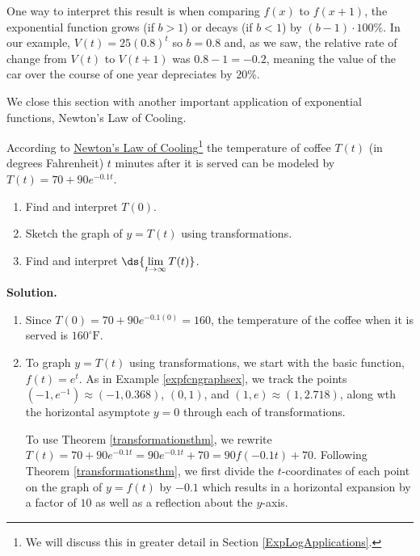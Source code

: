 \documentclass{ximera}
\begin{document}
One way to interpret this result is when comparing $f(x)$ to $f(x+1)$, the exponential function grows (if $b>1$) or decays (if $b<1$) by $(b-1) \cdot 100 \%$.  In our example, $V(t) = 25 (0.8)^{t}$ so $b = 0.8$ and, as we saw, the relative rate of change from $V(t)$ to $V(t+1)$ was $ 0.8 - 1= -0.2$, meaning the value of the car  over the course of one year depreciates by  $20 \%$.

\smallskip

We close this section with another important application of exponential functions,  Newton's Law of Cooling.

\smallskip

\begin{example}  \label{exptempex} According to \href{http://en.wikipedia.org/wiki/Heat_transfer#Newton.27s_law_of_cooling}{\underline{Newton's Law of Cooling}}\footnote{We will discuss this in greater detail in Section \ref{ExpLogApplications}.} the temperature of coffee $T(t)$ (in degrees Fahrenheit) $t$ minutes after it is served can be modeled by $T(t) = 70 + 90 e^{-0.1 t}$. 

\begin{enumerate}

\item  Find and interpret $T(0)$.

\item  Sketch the graph of $y = T(t)$ using transformations.

\item  Find and interpret $\ds{\lim_{t \rightarrow \infty} T(t)}$.  

\end{enumerate}

{\bf Solution.}

\begin{enumerate}

\item  Since $T(0) =70 + 90 e^{-0.1 (0)} = 160$,   the temperature of the coffee when it is served is $160^{\circ}\mbox{F}$.

\item  To graph $y = T(t)$ using transformations, we start with the basic function, $f(t)=e^{t}$.  As in Example \ref{expfcngraphsex}, we track the points $(-1, e^{-1}) \approx (-1, 0.368)$, $(0,1)$, and $(1, e) \approx (1, 2.718)$, along wth the horizontal asymptote $y = 0$ through each of transformations.

\smallskip

To use Theorem  \ref{transformationsthm}, we rewrite   $T(t) = 70 + 90e^{-0.1t} = 90e^{-0.1t}+70 = 90 f(-0.1t)+70$.   Following Theorem  \ref{transformationsthm}, we first  divide the $t$-coordinates of each point on the graph of $y=f(t)$ by $-0.1$ which results in a horizontal expansion by a factor of $10$ as well as a reflection about the $y$-axis.  


\end{enumerate}
\end{example}
\end{document}

